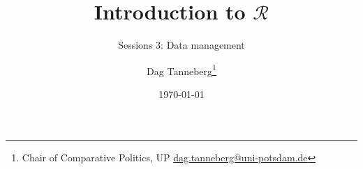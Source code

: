 \usepackage[utf8]{inputenc}
\usepackage{hyperref}
\usepackage{graphicx}
\usepackage{booktabs}

\title{Introduction to $\mathcal{R}$}
\subtitle{Sessions 3: Data management}
\author{Dag Tanneberg\thanks{%
  Chair of Comparative Politics, UP %
  \href{mailto:dag.tanneberg@uni-potsdam.de}%
    {dag.tanneberg@uni-potsdam.de}
  }
}
\date{\today}


